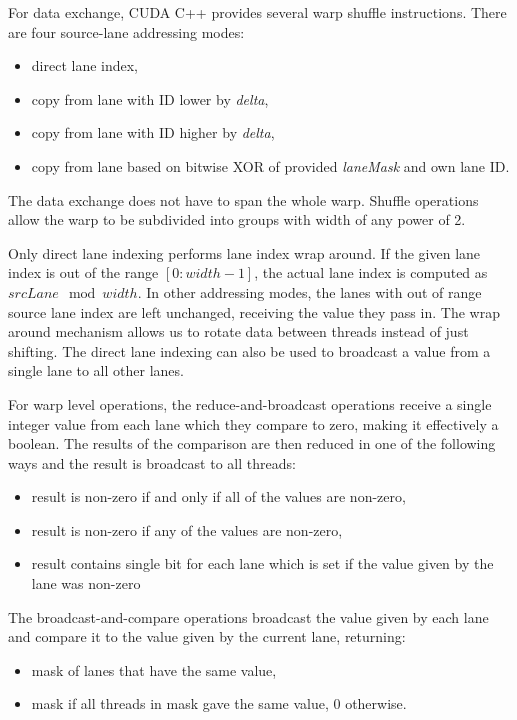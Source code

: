 For data exchange, CUDA C++ provides several warp shuffle instructions. There are four source-lane addressing modes:
\begin{itemize}
	\item direct lane index,
	\item copy from lane with ID lower by \textit{delta},
	\item copy from lane with ID higher by \textit{delta},
	\item copy from lane based on bitwise XOR of provided \textit{laneMask} and own lane ID. 
\end{itemize}

The data exchange does not have to span the whole warp. Shuffle operations allow the warp to be subdivided into groups with width of any power of 2.

Only direct lane indexing performs lane index wrap around. If the given lane index is out of the range $[0:width - 1]$, the actual lane index is computed as $srcLane \mod width$. In other addressing modes, the lanes with out of range source lane index are left unchanged, receiving the value they pass in. The wrap around mechanism allows us to rotate data between threads instead of just shifting. The direct lane indexing can also be used to broadcast a value from a single lane to all other lanes. %

For warp level operations, the reduce-and-broadcast operations receive a single integer value from each lane which they compare to zero, making it effectively a boolean. The results of the comparison are then reduced in one of the following ways and the result is broadcast to all threads:
\begin{itemize}
	\item result is non-zero if and only if all of the values are non-zero,
	\item result is non-zero if any of the values are non-zero,
	\item result contains single bit for each lane which is set if the value given by the lane was non-zero
\end{itemize}

The broadcast-and-compare operations broadcast the value given by each lane and compare it to the value given by the current lane, returning:
\begin{itemize}
	\item mask of lanes that have the same value,
	\item mask if all threads in mask gave the same value, 0 otherwise.
\end{itemize}

